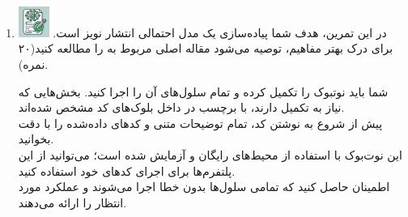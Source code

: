 \documentclass[12pt]{article}
\begin{document}
\begin{enumerate}
     \item \includegraphics[width=1cm]{figs/Allowed_with_contributino.jpg}
     در این تمرین، هدف شما پیاده‌سازی یک مدل احتمالی انتشار نویز است. برای درک بهتر مفاهیم، توصیه می‌شود مقاله اصلی مربوط به \href{https://arxiv.org/pdf/2006.11239}{} را مطالعه کنید(۲۰ نمره).

    شما باید نوتبوک  را تکمیل کرده و تمام سلول‌های آن را اجرا کنید. بخش‌هایی که نیاز به تکمیل دارند، با برچسب  در داخل بلوک‌های کد مشخص شده‌اند.\\
    پیش از شروع به نوشتن کد، تمام توضیحات متنی و کدهای داده‌شده را با دقت بخوانید.\\
    این نوت‌بوک با استفاده از محیط‌های رایگان  و  آزمایش شده است؛ می‌توانید از این پلتفرم‌ها برای اجرای کدهای خود استفاده کنید.\\
    اطمینان حاصل کنید که تمامی سلول‌ها بدون خطا اجرا می‌شوند و عملکرد مورد انتظار را ارائه می‌دهند.\\

\end{enumerate}
\end{document}
